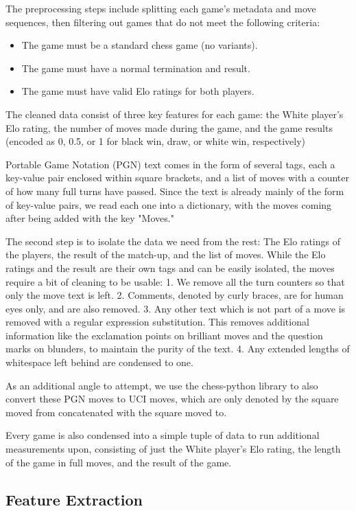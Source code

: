\documentclass[conference]{IEEEtran}
\begin{document}
The preprocessing steps include splitting each game's metadata and move sequences, then filtering out games that do not meet the following criteria:
\begin{itemize}
    \item The game must be a standard chess game (no variants).
    \item The game must have a normal termination and result.
    \item The game must have valid Elo ratings for both players.
\end{itemize}

The cleaned data consist of three key features for each game: the White player's Elo rating, the number of moves made during the game, and the game results (encoded as 0, 0.5, or 1 for black win, draw, or white win, respectively)

Portable Game Notation (PGN) text comes in the form of several tags, each a key-value pair enclosed within square brackets, and a list of moves with a counter of how many full turns have passed. Since the text is already mainly of the form of key-value pairs, we read each one into a dictionary, with the moves coming after being added with the key "Moves."

The second step is to isolate the data we need from the rest: The Elo ratings of the players, the result of the match-up, and the list of moves. While the Elo ratings and the result are their own tags and can be easily isolated, the moves require a bit of cleaning to be usable:
1. We remove all the turn counters so that only the move text is left.
2. Comments, denoted by curly braces, are for human eyes only, and are also removed.
3. Any other text which is not part of a move is removed with a regular expression substitution. This removes additional information like the exclamation points on brilliant moves and the question marks on blunders, to maintain the purity of the text.
4. Any extended lengths of whitespace left behind are condensed to one.

As an additional angle to attempt, we use the chess-python library to also convert these PGN moves to UCI moves, which are only denoted by the square moved from concatenated with the square moved to.

Every game is also condensed into a simple tuple of data to run additional measurements upon, consisting of just the White player's Elo rating, the length of the game in full moves, and the result of the game.

\subsection{Feature Extraction}
\end{document}

